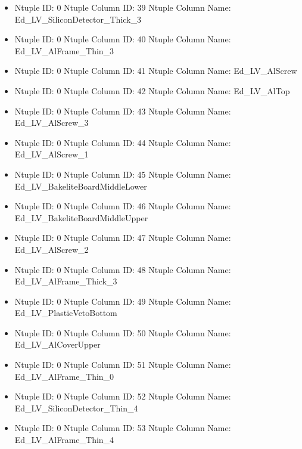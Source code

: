 \documentclass[8pt]{beamer}
\begin{document}
\begin{frame}
\begin{itemize}
        \item Ntuple ID: 0 Ntuple Column ID: 39 Ntuple Column Name: Ed\_LV\_SiliconDetector\_Thick\_3
        
        \item Ntuple ID: 0 Ntuple Column ID: 40 Ntuple Column Name: Ed\_LV\_AlFrame\_Thin\_3
        
        \item Ntuple ID: 0 Ntuple Column ID: 41 Ntuple Column Name: Ed\_LV\_AlScrew
        
        \item Ntuple ID: 0 Ntuple Column ID: 42 Ntuple Column Name: Ed\_LV\_AlTop
        
        \item Ntuple ID: 0 Ntuple Column ID: 43 Ntuple Column Name: Ed\_LV\_AlScrew\_3
        
        \item Ntuple ID: 0 Ntuple Column ID: 44 Ntuple Column Name: Ed\_LV\_AlScrew\_1
        
        \item Ntuple ID: 0 Ntuple Column ID: 45 Ntuple Column Name: Ed\_LV\_BakeliteBoardMiddleLower
        
        \item Ntuple ID: 0 Ntuple Column ID: 46 Ntuple Column Name: Ed\_LV\_BakeliteBoardMiddleUpper
        
        \item Ntuple ID: 0 Ntuple Column ID: 47 Ntuple Column Name: Ed\_LV\_AlScrew\_2
        
        \item Ntuple ID: 0 Ntuple Column ID: 48 Ntuple Column Name: Ed\_LV\_AlFrame\_Thick\_3
        
        \item Ntuple ID: 0 Ntuple Column ID: 49 Ntuple Column Name: Ed\_LV\_PlasticVetoBottom
        
        \item Ntuple ID: 0 Ntuple Column ID: 50 Ntuple Column Name: Ed\_LV\_AlCoverUpper
        
        \item Ntuple ID: 0 Ntuple Column ID: 51 Ntuple Column Name: Ed\_LV\_AlFrame\_Thin\_0
        
        \item Ntuple ID: 0 Ntuple Column ID: 52 Ntuple Column Name: Ed\_LV\_SiliconDetector\_Thin\_4
        
        \item Ntuple ID: 0 Ntuple Column ID: 53 Ntuple Column Name: Ed\_LV\_AlFrame\_Thin\_4
        

\end{itemize}
\end{frame}
\end{document}

